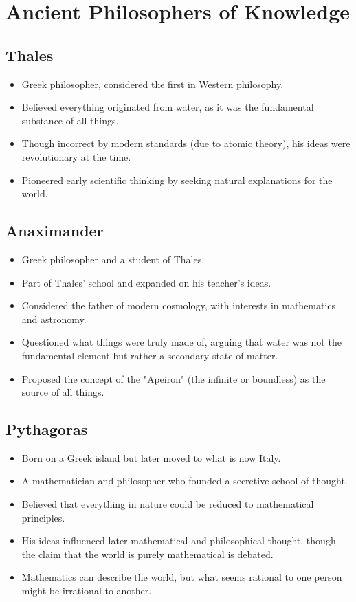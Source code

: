 
\section{Ancient Philosophers of Knowledge}

\subsection{Thales}

\begin{itemize}
    \item Greek philosopher, considered the first in Western philosophy.
    \item Believed everything originated from water, as it was the fundamental substance of all things.
    \item Though incorrect by modern standards (due to atomic theory), his ideas were revolutionary at the time.
    \item Pioneered early scientific thinking by seeking natural explanations for the world.
\end{itemize}

\subsection{Anaximander}

\begin{itemize}
    \item Greek philosopher and a student of Thales.
    \item Part of Thales' school and expanded on his teacher’s ideas.
    \item Considered the father of modern cosmology, with interests in mathematics and astronomy.
    \item Questioned what things were truly made of, arguing that water was not the fundamental element but rather a secondary state of matter.
    \item Proposed the concept of the "Apeiron" (the infinite or boundless) as the source of all things.
\end{itemize}

\subsection{Pythagoras}

\begin{itemize}
    \item Born on a Greek island but later moved to what is now Italy.
    \item A mathematician and philosopher who founded a secretive school of thought.
    \item Believed that everything in nature could be reduced to mathematical principles.
    \item His ideas influenced later mathematical and philosophical thought, though the claim that the world is purely mathematical is debated.
    \item Mathematics can describe the world, but what seems rational to one person might be irrational to another.
\end{itemize}

